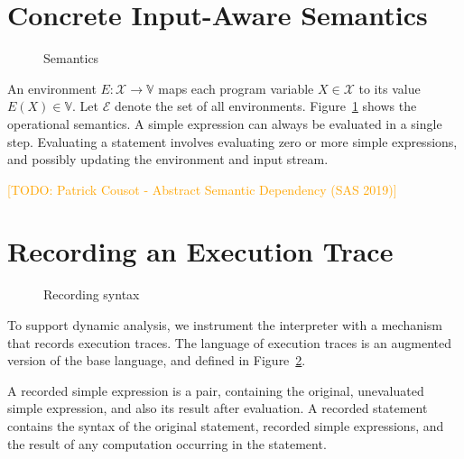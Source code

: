 \documentclass{article}
\newcommand{\vars}{\ensuremath{\mathcal{X}}\xspace} %
\newcommand{\vals}{\ensuremath{\mathbb{V}}\xspace} %
\newcommand{\envs}{\ensuremath{\mathcal{E}}\xspace} %
\newcommand{\irem}[3]{{\noindent\textcolor{#1}{\textsf{[#2: 
#3]}}}}
\newcommand{\todo}[1]{\irem{orange}{TODO}{#1}}
\begin{document}
\pagebreak
\section*{Concrete Input-Aware Semantics}

\begin{figure}[th!]
  \begin{center}
    \begin{small}
      \ottdefnevalXXse{}\ottinterrule
      \ottdefnevalXXs{}
    \end{small}
  \end{center}
  \caption{Semantics}\label{fig:semantics}
\end{figure}

An environment $E\colon \vars \rightarrow \vals$ maps each program variable $X
\in \vars$ to its value $E(X) \in \vals$. Let \envs denote the set of all environments.
Figure~\ref{fig:semantics} shows the operational semantics.
A simple expression can always be evaluated in a single step.
Evaluating a statement involves evaluating zero or more simple expressions, and
possibly updating the environment and input stream.

\todo{Patrick Cousot - Abstract Semantic Dependency (SAS 2019)}

\section*{Recording an Execution Trace}

\begin{figure}[th!]
  \begin{center}
    \begin{small}
      \grammartabularSTY{%
        \ottrse\ottinterrule%
        \ottrs\ottinterrule%
        \ottT\ottinterrule%
        \ottrC\ottafterlastrule%
      }
    \end{small}
  \end{center}
  \caption{Recording syntax}\label{fig:rec-syntax}
\end{figure}

To support dynamic analysis, we instrument the interpreter with a mechanism that
records execution traces. The language of execution traces is an augmented
version of the base language, and defined in Figure~\ref{fig:rec-syntax}.

A recorded simple expression is a pair, containing the original, unevaluated
simple expression, and also its result after evaluation. A recorded statement
contains the syntax of the original statement, recorded simple expressions, and
the result of any computation occurring in the statement.
\end{document}
